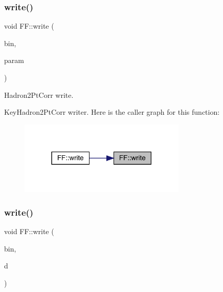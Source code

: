 \subsubsection{\texorpdfstring{write()}{write()}\hspace{0.1cm}{\footnotesize\ttfamily [11/13]}}
{\footnotesize\ttfamily void F\+F\+::write (\begin{DoxyParamCaption}\item[{\mbox{\hyperlink{classADATIO_1_1BinaryWriter}{Binary\+Writer}} \&}]{bin,  }\item[{const \mbox{\hyperlink{structFF_1_1KeyHadron2PtCorr__t}{Key\+Hadron2\+Pt\+Corr\+\_\+t}} \&}]{param }\end{DoxyParamCaption})}



Hadron2\+Pt\+Corr write. 

Key\+Hadron2\+Pt\+Corr writer. Here is the caller graph for this function\+:\nopagebreak
\begin{figure}[H]
\begin{center}
\leavevmode
\includegraphics[width=226pt]{d5/da6/namespaceFF_a1b83f6ebd714e1d672d8c425605ff1de_icgraph}
\end{center}
\end{figure}
\mbox{\label{namespaceFF_a6906b2ce111930a390f4a8e81b1730b6}} 
\subsubsection{\texorpdfstring{write()}{write()}\hspace{0.1cm}{\footnotesize\ttfamily [12/13]}}
{\footnotesize\ttfamily void F\+F\+::write (\begin{DoxyParamCaption}\item[{\mbox{\hyperlink{classADATIO_1_1BinaryWriter}{Binary\+Writer}} \&}]{bin,  }\item[{const \mbox{\hyperlink{classFF_1_1DiscoValOperator__t}{Disco\+Val\+Operator\+\_\+t}} \&}]{d }\end{DoxyParamCaption})}



